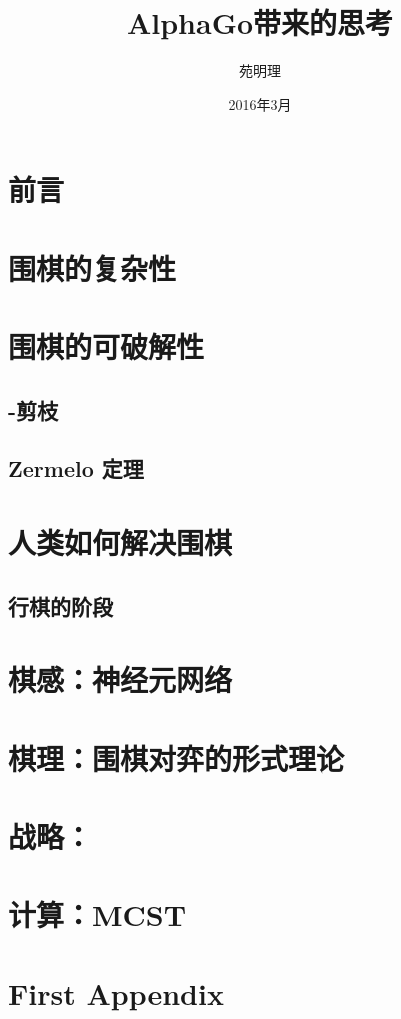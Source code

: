 \documentclass[a4paper,12pt]{article}
\title{AlphaGo带来的思考}
\author{苑明理}
\date{2016年3月}
\begin{document}
\maketitle{}

\renewcommand\contentsname{目录}
\setcounter{tocdepth}{2}
\tableofcontents

\newpage

\section{前言}

\newpage

\section{围棋的复杂性}

\section{围棋的可破解性}

\subsection{\alpha-\beta 剪枝}

\subsection{Zermelo 定理}

\section{人类如何解决围棋}

\subsection{行棋的阶段}

\section{棋感：神经元网络}

\section{棋理：围棋对弈的形式理论}

\section{战略：}

\section{计算：MCST}

\appendix
\section{First Appendix}
\end{document}
